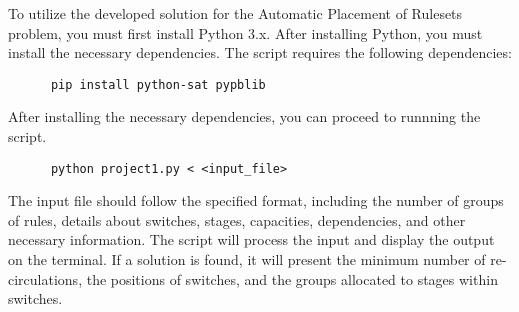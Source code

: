 To utilize the developed solution for the Automatic Placement of Rulesets problem, you must first install Python 3.x. After installing Python, you must install the necessary dependencies. The script requires the following dependencies:

\begin{verbatim}
      pip install python-sat pypblib
\end{verbatim}

After installing the necessary dependencies, you can proceed to runnning the script.

\begin{verbatim}
      python project1.py < <input_file>
\end{verbatim}

The input file should follow the specified format, including the number of groups of rules, details about switches, stages, capacities, dependencies, and other necessary information. The script will process the input and display the output on the terminal. If a solution is found, it will present the minimum number of re-circulations, the positions of switches, and the groups allocated to stages within switches.